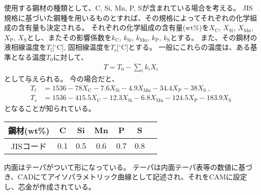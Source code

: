 


使用する鋼材の種類として、C, Si, Mn, P, Sが含まれている場合を考える。
JIS規格に基づいた鋼種を用いるものとすれば、その規格によってそれぞれの化学組成の含有量も決定される。
それぞれの化学組成の含有量($\mathrm{wt}\%$)を$X_\mathrm C$, $X_\mathrm{Si}$, $X_\mathrm{Mn}$, $X_\mathrm P$, $X_\mathrm S$とし、またその影響係数を$k_\mathrm C$, $k_\mathrm{Si}$, $k_\mathrm{Mn}$, $k_\mathrm P$, $k_\mathrm S$とする。
また、その鋼材の液相線温度を$T_\mathrm l$[$^\circ\mathrm C$], 固相線温度を$T_\mathrm s$[$^\circ\mathrm C$]とする。
一般にこれらの温度は、ある基準となる温度$T_0$に対して、
\begin{align*}
  T = T_0-\sum_i k_iX_i
\end{align*}
として与えられる。
今の場合だと、
\begin{align*}
  T_l
  &= 1536-78X_\mathrm C-7.6X_\mathrm{Si}-4.9X_\mathrm{Mn}-34.4X_\mathrm P-38X_\mathrm S~,\\
  T_s
  &= 1536-415.5X_\mathrm C-12.3X_\mathrm{Si}-6.8X_\mathrm{Mn}-124.5X_\mathrm P-183.9X_\mathrm S
\end{align*}
となることが知られている\cite{1986KO}。\\
\begin{tabular}[t]{|c|c|c|c|c|c|c|}
  \hline
  鋼材(wt\%) & C & Si & Mn & P & S
  \\\hline
  \index{JISコード}JISコード & 0.1 & 0.5 & 0.6 & 0.7 & 0.8
  \\\hline
\end{tabular}


\clearpage
内面はテーパがついて形になっている。
テーパは内面テーパ表等の数値に基づき、CADにてアイソパラメトリック曲線として記述され、それをCAMに設定し、芯金が作成されている。
